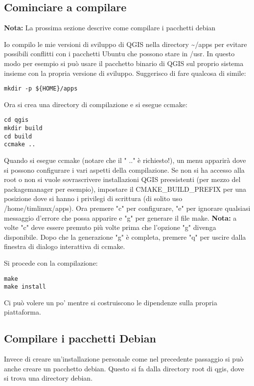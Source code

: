 \subsection{Cominciare a compilare}
\textbf{Nota:} La prossima sezione descrive come compilare i pacchetti debian

Io compilo le mie versioni di sviluppo di QGIS nella directory \~{}/apps per evitare possibili conflitti con i pacchetti Ubuntu che possono stare in /usr. In questo modo per esempio si può usare il pacchetto binario di QGIS sul proprio sistema insieme con la propria versione di sviluppo. Suggerisco di fare qualcosa di simile:

\begin{verbatim}
mkdir -p ${HOME}/apps 
\end{verbatim}

Ora si crea una directory di compilazione e si esegue ccmake:

\begin{verbatim}
cd qgis
mkdir build
cd build
ccmake ..
\end{verbatim}

Quando si esegue ccmake (notare che il " .." è richiesto!), un menu apparirà dove si possono configurare i vari aspetti della compilazione. Se non si ha accesso alla root o non si vuole sovrascrivere installazioni QGIS preesistenti (per mezzo del packagemanager per esempio), impostare il CMAKE\_BUILD\_PREFIX per una posizione dove si hanno i privilegi di scrittura (di solito uso /home/timlinux/apps). Ora premere "c" per configurare, "e" per ignorare qualsiasi messaggio d'errore che possa apparire e "g" per generare il file make. \textbf{Nota:} a volte "c" deve essere premuto più volte prima che l'opzione "g" divenga disponibile. Dopo che la generazione "g" è completa, premere "q" per uscire dalla finestra di dialogo interattiva di ccmake.

Si procede con la compilazione:

\begin{verbatim}
make
make install
\end{verbatim}

Ci può volere un po' mentre si costruiscono le dipendenze sulla propria piattaforma.

\subsection{Compilare i pacchetti Debian}
Invece di creare un'installazione personale come nel precedente passaggio si può anche creare un pacchetto debian. Questo si fa dalla directory root di qgis, dove si trova una directory debian.

